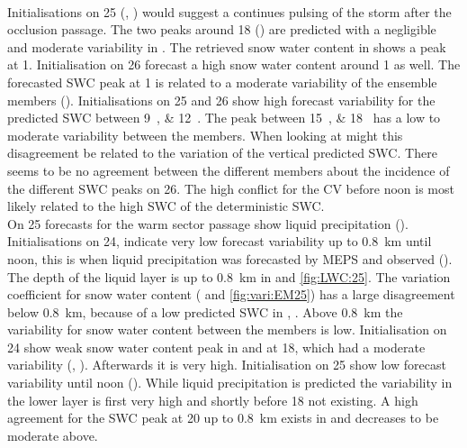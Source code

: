 \\
Initialisations on \SI{25}{\dec} (, ) would suggest a continues pulsing of the storm after the occlusion passage. The two peaks around \SI{18}{\UTC} () are predicted with a negligible and moderate variability in . %
The retrieved snow water content in  shows a peak at \SI{1}{\UTC}.
Initialisation on \SI{26}{\dec} forecast a high snow water content around \SI{1}{\UTC} as well. The forecasted SWC peak at \SI{1}{\UTC} is related to a moderate variability of the ensemble members (). 
Initialisations on \num{25} and \SI{26}{\dec} show high forecast variability for the predicted SWC between \SIlist{9;12}{\UTC}. The peak between \SIlist{15;18}{\UTC} has a low to moderate variability between the members. When looking at  might this disagreement be related to the variation of the vertical predicted SWC. There seems to be no agreement between the different members about the incidence of the different SWC peaks on \SI{26}{\dec}. The high conflict for the CV before noon is most likely related to the high SWC of the deterministic SWC.
\\
On \SI{25}{\dec} forecasts for the warm sector passage show liquid precipitation ().
%
Initialisations on \SI{24}{\dec}, indicate very low forecast variability up to \SI{0.8}{\km} until noon, this is when liquid precipitation was forecasted by MEPS and observed ().
The depth of the liquid layer is up to \SI{0.8}{\km} in  and \ref{fig:LWC:25}. The variation coefficient for snow water content ( and \ref{fig:vari:EM25}) has a large disagreement below \SI{0.8}{\km}, because of a low predicted SWC in , .
Above \SI{0.8}{\km} the variability for snow water content between the members is low. Initialisation on \SI{24}{\dec} show weak snow water content peak in  and  at \SI{18}{\UTC}, which had a moderate variability (, ). Afterwards it is very high. Initialisation on \SI{25}{\dec} show low forecast variability until noon (). While liquid precipitation is predicted the variability in the lower layer is first very high and shortly before \SI{18}{\UTC} not existing. A high agreement for the SWC peak at \SI{20}{\UTC} up to \SI{0.8}{\km} exists in  and decreases to be moderate above.
